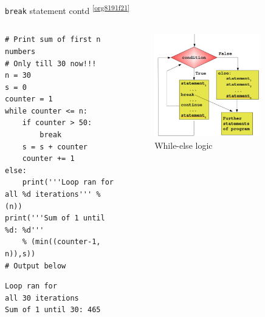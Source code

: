 \documentclass[presentation]{beamer}
\begin{document}
\begin{frame}[label={sec:org50da650},fragile]{\texttt{break} statement contd \textsuperscript{\ref{org8191f21}}}
 \begin{columns}
\begin{column}{0.48\columnwidth}
\scriptsize
\begin{verbatim}
# Print sum of first n numbers
# Only till 30 now!!!
n = 30
s = 0
counter = 1
while counter <= n:
    if counter > 50:
        break
    s = s + counter
    counter += 1
else:
    print('''Loop ran for
all %d iterations''' % (n))
print('''Sum of 1 until %d: %d'''
    % (min((counter-1, n)),s))
# Output below
\end{verbatim}

\begin{verbatim}
Loop ran for
all 30 iterations
Sum of 1 until 30: 465
\end{verbatim}
\end{column}

\begin{column}{0.45\columnwidth}
\footnotesize
\begin{figure}[htbp]
\centering
\includegraphics[width=0.8\textwidth]{images/while_loop_with_else_break.png}
\caption{While-else logic}
\end{figure}
\end{column}
\end{columns}
\end{frame}
\end{document}
